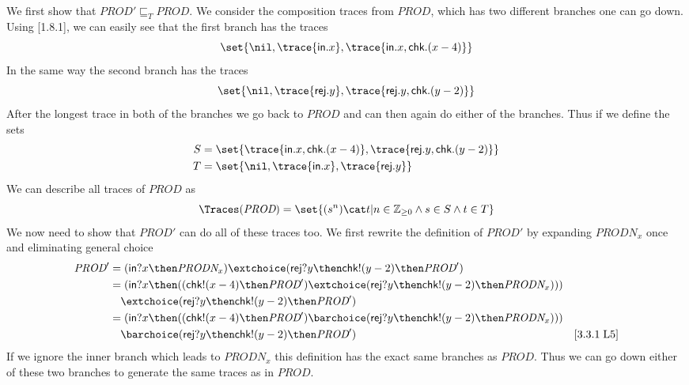 \documentclass[a4paper, 11pt]{article}
\def\Prod{\textit{PROD}}
\def\Prodn{\textit{PRODN}_x}
\def\inc{\textsf{in}}
\def\chk{\textsf{chk}}
\def\rej{\textsf{rej}}
\newcommand{\law}[2]{[#1\;\text{#2}]}
\begin{document}
We first show that $\Prod' \sqsubseteq_T \Prod$. We consider the composition traces from $\Prod$, which has two different branches one can go down. Using \law{1.8.1}{L2-L3}, we can easily see that the first branch has the traces
\[
\set{\nil, \trace{\inc . x}, \trace{\inc . x, \chk . (x-4)}}
\]
In the same way the second branch has the traces
\[
\set{\nil, \trace{\rej . y}, \trace{\rej . y, \chk . (y-2)}}
\]
After the longest trace in both of the branches we go back to $\Prod$ and can then again do either of the branches. Thus if we define the sets
\begin{align*}
S &= \set{\trace{\inc . x, \chk . (x-4)}, \trace{\rej . y, \chk . (y-2)}} \\
T &= \set{\nil, \trace{\inc . x}, \trace{\rej . y}}
\end{align*}
We can describe all traces of $\Prod$ as
\[
    \Traces(\Prod) = \set{(s^n) \cat t | n \in \mathbb{Z}_{\ge 0} \land s \in S \land t \in T}
\]
We now need to show that $\Prod'$ can do all of these traces too. We first rewrite the definition of $\Prod'$ by expanding $\Prodn$ once and eliminating general choice
\begin{align*}
    \Prod'
    &= (\inc ? x \then \Prodn) \extchoice (\rej ? y \then \chk ! (y-2) \then \Prod') \\
    & = (\inc ? x \then ((\chk ! (x-4) \then \Prod') \extchoice (\rej ? y \then \chk ! (y-2) \then \Prodn))) \\
    &\quad \extchoice (\rej ? y \then \chk ! (y-2) \then \Prod') \\
    & = (\inc ? x \then ((\chk ! (x-4) \then \Prod') \barchoice (\rej ? y \then \chk ! (y-2) \then \Prodn))) \\
    &\quad \barchoice (\rej ? y \then \chk ! (y-2) \then \Prod') & \law{3.3.1}{L5} \\
\end{align*}
If we ignore the inner branch which leads to $\Prodn$ this definition has the exact same branches as $\Prod$. Thus we can go down either of these two branches to generate the same traces as in $\Prod$.
\end{document}
